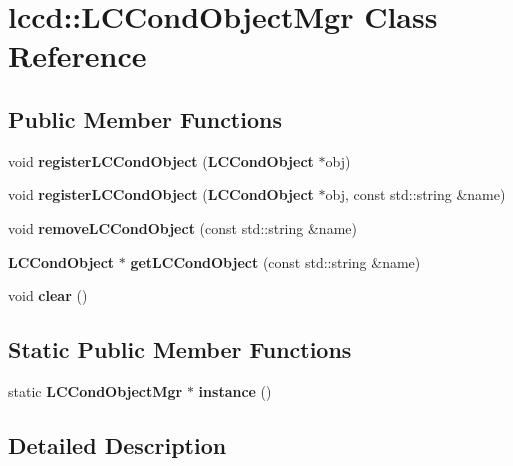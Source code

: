 \section{lccd\-:\-:L\-C\-Cond\-Object\-Mgr Class Reference}
\label{classlccd_1_1LCCondObjectMgr}
\subsection*{Public Member Functions}
\begin{DoxyCompactItemize}
\item 
void {\bfseries register\-L\-C\-Cond\-Object} ({\bf L\-C\-Cond\-Object} $\ast$obj)\label{classlccd_1_1LCCondObjectMgr_a5b0c841bd7baba67058ff038a37d6bf1}

\item 
void {\bfseries register\-L\-C\-Cond\-Object} ({\bf L\-C\-Cond\-Object} $\ast$obj, const std\-::string \&name)\label{classlccd_1_1LCCondObjectMgr_a8f19da887e6789603d76542f5d6276af}

\item 
void {\bfseries remove\-L\-C\-Cond\-Object} (const std\-::string \&name)\label{classlccd_1_1LCCondObjectMgr_aff3f7984a32c5d22343f20e18899f24d}

\item 
{\bf L\-C\-Cond\-Object} $\ast$ {\bfseries get\-L\-C\-Cond\-Object} (const std\-::string \&name)\label{classlccd_1_1LCCondObjectMgr_adbbd2fc04da7f8051426753accae29ee}

\item 
void {\bfseries clear} ()\label{classlccd_1_1LCCondObjectMgr_af75565bcf3c46cbbed5e667fb5a6e815}

\end{DoxyCompactItemize}
\subsection*{Static Public Member Functions}
\begin{DoxyCompactItemize}
\item 
static {\bf L\-C\-Cond\-Object\-Mgr} $\ast$ {\bfseries instance} ()\label{classlccd_1_1LCCondObjectMgr_a22f8215e23eccae0b5df78077b8f2b38}

\end{DoxyCompactItemize}


\subsection{Detailed Description}


